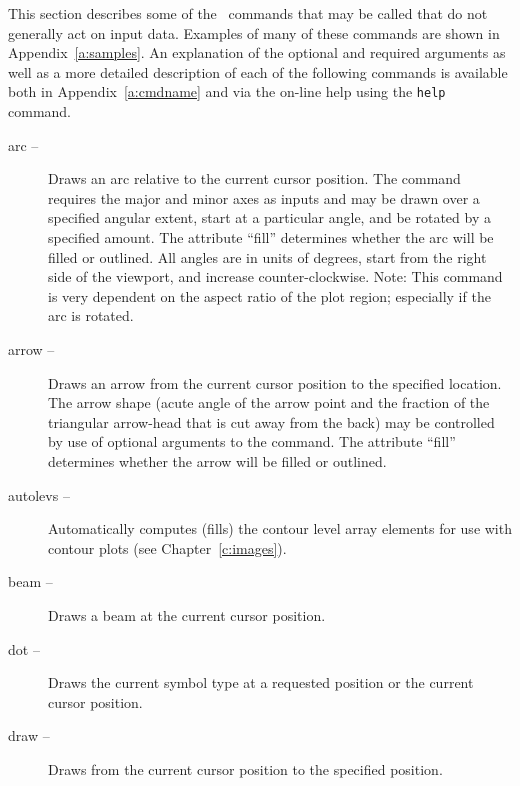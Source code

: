 This section describes some of the \wip\ commands that may be called
that do not generally act on input data.
Examples of many of these commands
are shown in Appendix~\ref{a:samples}.
An explanation of the optional and required arguments as well as
a more detailed description of each of the following commands
is available both
in Appendix~\ref{a:cmdname} and via the on-line help using the
{\tt help} command.
\begin{description}
  \item [{arc --}]
    Draws an arc relative to the current cursor position.
    The command requires the major and minor
    axes as inputs and may be drawn over a specified angular extent,
    start at a particular angle, and be rotated by a specified amount.
    The attribute ``fill'' determines whether
    the arc will be filled or outlined.
    All angles are in units of degrees, start from the right side of
    the viewport, and increase counter-clockwise.
    {\sc Note}:  This command is very dependent on the aspect
    ratio of the plot region;
    especially if the arc is rotated.
  \item [{arrow --}]
    Draws an arrow from the current cursor position to the specified location.
    The arrow shape (acute angle of the arrow point and the fraction of
    the triangular arrow-head that is cut away from the back)
    may be controlled by use of optional arguments to the command.
    The attribute ``fill'' determines whether
    the arrow will be filled or outlined.
  \item [{autolevs --}]%
    Automatically computes (fills) the contour level array elements
    for use with contour plots (see Chapter~\ref{c:images}).
  \item [{beam --}]%
    Draws a beam at the current cursor position.
  \item [{dot --}] Draws the current symbol
    type at a requested position or the current cursor position.
  \item [{draw --}] Draws from the
    current cursor position to the specified position.

\end{description}
